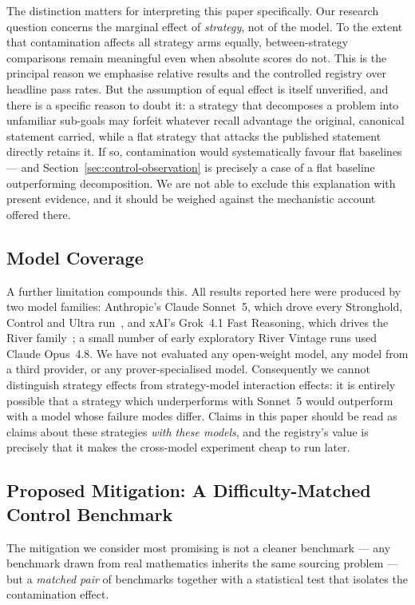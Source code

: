 \documentclass[12pt, a4paper]{article}
\begin{document}
The distinction matters for interpreting this paper specifically. Our
research question concerns the marginal effect of \emph{strategy}, not of
the model. To the extent that contamination affects all strategy arms
equally, between-strategy comparisons remain meaningful even when absolute
scores do not. This is the principal reason we emphasise relative results
and the controlled registry over headline pass rates. But the assumption of
equal effect is itself unverified, and there is a specific reason to doubt
it: a strategy that decomposes a problem into unfamiliar sub-goals may
forfeit whatever recall advantage the original, canonical statement carried,
while a flat strategy that attacks the published statement directly retains
it. If so, contamination would systematically favour flat baselines --- and
Section~\ref{sec:control-observation} is precisely a case of a flat baseline
outperforming decomposition. We are not able to exclude this explanation
with present evidence, and it should be weighed against the mechanistic
account offered there.

\subsection{Model Coverage}

A further limitation compounds this. All results reported here were
produced by two model families: Anthropic's Claude Sonnet~5, which drove
every Stronghold, Control and Ultra run~\cite{anthropic2026sonnet5}, and
xAI's Grok~4.1 Fast Reasoning, which drives the River
family~\cite{xai2025grok41}; a small number of early exploratory River
Vintage runs used Claude Opus~4.8. We have not evaluated any open-weight
model, any model from a third provider, or any prover-specialised model.
Consequently we cannot distinguish strategy effects from
strategy-model interaction effects: it is entirely possible that a strategy
which underperforms with Sonnet~5 would outperform with a model whose
failure modes differ. Claims in this paper should be read as claims about
these strategies \emph{with these models}, and the registry's value is
precisely that it makes the cross-model experiment cheap to run later.

\subsection{Proposed Mitigation: A Difficulty-Matched Control Benchmark}
\label{sec:contamination-mitigation}

The mitigation we consider most promising is not a cleaner benchmark --- any
benchmark drawn from real mathematics inherits the same sourcing problem ---
but a \emph{matched pair} of benchmarks together with a statistical test
that isolates the contamination effect.
\end{document}
